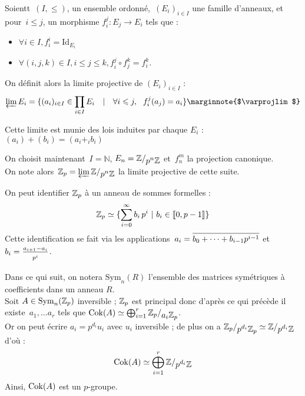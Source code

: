 \begin{defi}
Soientt~$(I, \leq)$, un ensemble ordonné,~$(E_i)_{i\in I}$ une famille d'anneaux, et pour~$i\leq j$, un morphisme $f_i^j : E_j \to E_i$ tels que :
\begin{itemize}
\item $\forall i\in I, f_i^i = \text{Id}_{E_i}$
\item $\forall (i,j,k)\in I, i\leq j\leq k, f_i^j \circ f_j^k = f_i^k$.
\end{itemize}
On définit alors la limite projective de $(E_i)_{i\in I}$ :
\[ \varprojlim{E_i} = \{(a_i)_{i\in I}\in \prod_{i\in I}{E_i}\quad |\quad\forall i\leq j,\ \  f_i^j(a_j) = a_i \} \text{\marginnote{$\varprojlim$}} \]

Cette limite est munie des lois induites par chaque $E_i$ : $(a_i) + (b_i) = (a_i +_i b_i)$
\end{defi}

On choisit maintenant~$I = \mathbb N$, $E_n = \quotient{\mathbb{Z}}{p^n \mathbb Z}$ et~$f_n^m$ la projection canonique.\\[0.2cm]
On note alors~$\Zp = \varprojlim{\quotient{\mathbb Z}{p^n\mathbb Z}}$ la limite projective de cette suite. \marginnote{$\Zp$}

\begin{rem}
On peut identifier $\Zp$ à un anneau de sommes formelles :
\[ \mathbb{Z}_p \simeq \{ \sum_{i=0}^\infty{b_i\,p^i}\   |\  b_i\in\llbracket0, p-1 \rrbracket\} \]
Cette identification se fait via les applications~$a_i = \overline{\strut b_0+\dots+b_{i-1}p^{i-1}}$ et~$b_i = \frac{a_{i+1}-a_i}{\strut p^i}$.\\
\end{rem}

Dans ce qui suit, on notera $\text{Sym}_n(R)$ l'ensemble des matrices symétriques à coefficients dans un anneau $R$.\\
Soit $A \in \operatorname{Sym}_n(\mathbb{Z}_p)$ inversible ; $\Zp$ est principal donc d'après ce qui précède il existe~$a_1, \dots a_r$ tels que $\Cok(A) \simeq \bigoplus_{i=1}^r{\quotient{\Zp}{a_i\Zp}}$.\\[0.2cm]
Or on peut écrire $a_i = p^{d_i}u_i$ avec $u_i$ inversible ; de plus on a $\quotient{\Zp}{p^{d_i}\Zp} \simeq \quotient{\mathbb Z}{p^{d_i}\mathbb Z}$ d'où :
\[ \Cok(A) \simeq \bigoplus_{i=1}^r \quotient{\mathbb Z}{p^{d_i}\mathbb Z} \]
Ainsi, $\operatorname{Cok}(A)$ est un $p$-groupe.